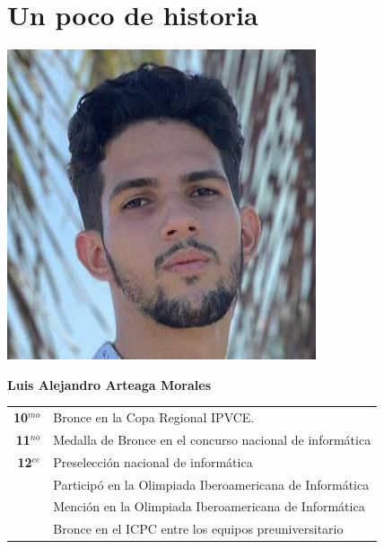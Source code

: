\pagestyle{fancy}
\lhead{}
\chead{}
\chapter*{Un poco de historia}





\begin{minipage}{0.2\textwidth}
	\includegraphics[width=\linewidth]{img/concursantes/alejandro.png} %
\end{minipage}
\hfill
\begin{minipage}{0.7\textwidth}
	\textbf{Luis Alejandro Arteaga Morales}
	
	\vspace*{0.1in}
	\begin{tabular}{rl}
	
		\textbf{10$^{mo}$} & Bronce en la Copa Regional IPVCE.  \\
		
		\textbf{11$^{no}$} & Medalla de Bronce en el concurso nacional de informática \\
		
		\textbf{12$^{ce}$} & Preselección nacional de informática  \\
		                   & Participó en la Olimpiada Iberoamericana de Informática  \\
		                   & Mención en la Olimpiada Iberoamericana de Informática  \\
		                   & Bronce en el ICPC entre los equipos preuniversitario  \\
		
	\end{tabular}
	
\end{minipage}

